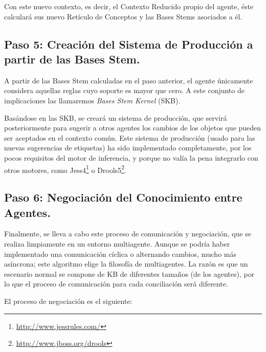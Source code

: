 Con este nuevo contexto, es decir, el Contexto Reducido propio del agente, éste calculará sus nuevo Retículo de Conceptos y las Bases Stems asociados a él.

\subsection{Paso 5: Creación del Sistema de Producción a partir de las Bases Stem.}

A partir de las Bases Stem calculadas en el paso anterior, el agente únicamente considera aquellas reglas cuyo soporte es mayor que cero. A este conjunto de implicaciones las llamaremos \emph{Bases Stem Kernel} (SKB).

Basándose en las SKB, se creará un sistema de producción, que servirá posteriormente para sugerir a otros agentes los cambios de los objetos que pueden ser aceptados en el contexto común. Este sistema de producción (usado para las nuevas sugerencias de etiquetas) ha sido implementado completamente, por los pocos requisitos del motor de inferencia, y porque no valía la pena integrarlo con otros motores, como Jess4\footnote{\url{http://www.jessrules.com/}} o Drools5\footnote{\url{http://www.jboss.org/drools}}.

\subsection{Paso 6: Negociación del Conocimiento entre Agentes.}

Finalmente, se lleva a cabo este proceso de comunicación y negociación, que se realiza limpiamente en un entorno multiagente. Aunque se podría haber implementado una comunicación cíclica o alternando cambios, mucho más asíncrona; este algoritmo elige la filosofía de multiagentes. La razón es que un escenario normal se compone de KB de diferentes tamaños (de los agentes), por lo que el proceso de comunicación para cada conciliación será diferente.

El proceso de negociación es el siguiente:


